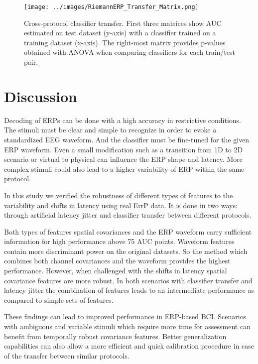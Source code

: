\documentclass[12pt]{iopart}
\begin{document}
\begin{figure*}[!t]
    \centerline{\texttt{[image: ../images/RiemannERP\_Transfer\_Matrix.png]}}
    \caption{Cross-protocol classifier transfer. First three matrices show AUC estimated
    on test dataset (y-axis) with a classifier trained on a training dataset (x-axis).
    The right-most matrix provides p-values obtained with ANOVA when comparing classifiers
    for each train/test pair.}
\label{fig:transfer}
\end{figure*}

\section{Discussion}
\label{sec:discussion}

Decoding of ERPs can be done with a high accuracy in restrictive conditions.
The stimuli must be clear and simple to recognize
in order to evoke a standardized EEG waveform. And the classifier
must be fine-tuned for the given ERP waveform. Even a small
modification such as a transition from 1D to 2D scenario or virtual to physical
can influence the ERP shape and latency. More complex stimuli
could also lead to a higher variability of ERP within the same protocol.

In this study we verified the robustness of different types of features
to the variability and shifts in latency using real ErrP data.
It is done in two ways: through artificial latency jitter
and classifier transfer between different protocols.

Both types of features spatial covariances and the ERP waveform
carry sufficient information for high performance above 75 AUC points.
Waveform features contain more discriminant power on the original datasets.
So the method which combines both channel covariances and the waveform
provides the highest performance.
However, when challenged with the shifts in latency
spatial covariance features are more robust.
In both scenarios with classifier transfer and latency jitter
the combination of features leads to an intermediate
performance as compared to simple sets of features.

These findings can lead to improved performance in ERP-based BCI. 
Scenarios with ambiguous and variable stimuli which require more time
for assessment can benefit from temporally robust covariance features.
Better generalization capabilities can also allow a more efficient and quick
calibration procedure in case of the transfer between similar protocols.
\end{document}
